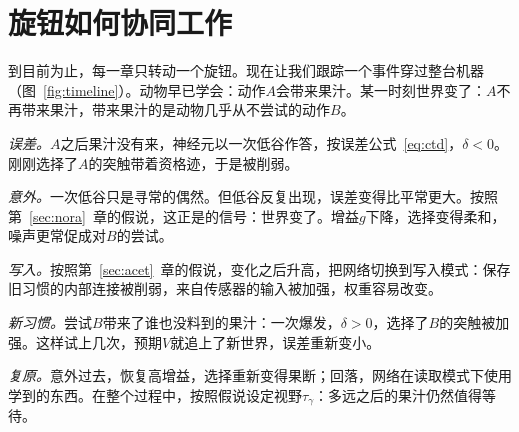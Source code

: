 \section{旋钮如何协同工作}

到目前为止，每一章只转动一个旋钮。现在让我们跟踪一个事件穿过整台机器（图~\ref{fig:timeline}）。动物早已学会：动作$A$会带来果汁。某一时刻世界变了：$A$不再带来果汁，带来果汁的是动物几乎从不尝试的动作$B$。

\emph{误差。}$A$之后果汁没有来，神经元以一次低谷作答，按误差公式~\eqref{eq:ctd}，$\delta<0$。刚刚选择了$A$的突触带着资格迹，于是被削弱。

\emph{意外。}一次低谷只是寻常的偶然。但低谷反复出现，误差变得比平常更大。按照第~\ref{sec:nora}~章的假说，这正是的信号：世界变了。增益$g$下降，选择变得柔和，噪声更常促成对$B$的尝试。

\emph{写入。}按照第~\ref{sec:acet}~章的假说，变化之后升高，把网络切换到写入模式：保存旧习惯的内部连接被削弱，来自传感器的输入被加强，权重容易改变。

\emph{新习惯。}尝试$B$带来了谁也没料到的果汁：一次爆发，$\delta>0$，选择了$B$的突触被加强。这样试上几次，预期$V$就追上了新世界，误差重新变小。

\emph{复原。}意外过去，恢复高增益，选择重新变得果断；回落，网络在读取模式下使用学到的东西。在整个过程中，按照假说设定视野$\tau_\gamma$：多远之后的果汁仍然值得等待。

